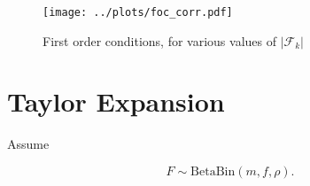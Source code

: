\documentclass[american, abstract=on]{scrartcl}
\newcommand{\F}{\mathcal{F}}
\newcommand{\E}{\mathbb{E}}
\newcommand{\abs}[1]{\left\lvert#1\right\rvert}
\begin{document}
\begin{figure}[H]
  \centering
  \texttt{[image: ../plots/foc\_corr.pdf]} 
  \caption{First order conditions, for various values of $\abs{\F_k}$}
  \label{fig:vert_foc_cor}
\end{figure}

\fi

\iffalse

\subsubsection{Social planner}

The social planner problem has a Bellman formulation. Let $G$ be such that  

\begin{equation}
  g_{i+1} = G(s, g_i).
\end{equation}

Then

\begin{equation}
  V(g) = \max_{s \in \mathbb{Z}} \left\{ m \pi \ \E_{\F_i} \Big[ p(s) \Big] - \kappa \ s + \E_{\F_i}\Big[  V\left(G(s, g)\right)\Big] \right\}
\end{equation}

The social optimum $\tilde{s}_s$ satisfies the first order condition

\begin{equation}
  m \pi \ \E_{\F_i} \left[ \frac{\partial p}{\partial s}\left(\tilde{s}_s\right) \right] = \kappa - \E_{\F_i} \left[ V'(G(\tilde{s}_s, g)) \ \frac{\partial G}{\partial s}(\tilde{s}_s, g)\right].
\end{equation}

where, for a given $f$,

\begin{equation}
  V'(g(f)) = m \pi \ p(\tilde{s}_s, f) + V(G(\tilde{s}_s, g(f))) + \E_{\F_i}\left[ V'\left(G(\tilde{s}_s, g(f))\right) \  \frac{\partial G}{\partial g}(\tilde{s}_s, g(f)) \right].
\end{equation}

\fi

\newpage
\printbibliography

\newpage
\appendix
\section{Taylor Expansion}

Assume 

\begin{equation}
  F \sim \text{BetaBin}(m, f, \rho).
\end{equation}
\end{document}
